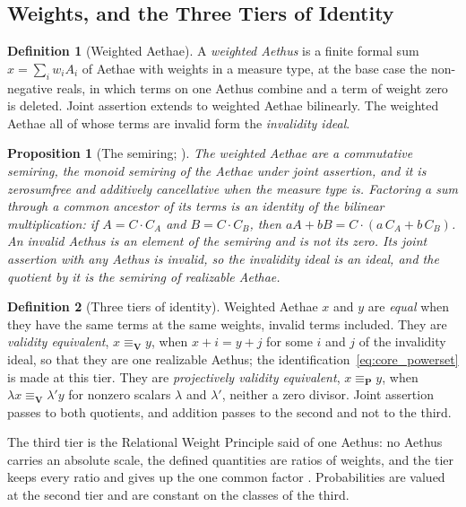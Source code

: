 \documentclass[11pt]{article}
\newtheorem{proposition}{Proposition}
\theoremstyle{definition}
\newtheorem{definition}{Definition}
\newcommand{\Aethus}{Aethus}
\begin{document}
\subsection{Weights, and the Three Tiers of Identity}\label{sec:core_weights}

\begin{definition}[Weighted Aethae]\label{def:core_weighted}
A \emph{weighted \Aethus{}} is a finite formal sum $x = \sum_i w_i A_i$ of Aethae with weights in a measure type, at the base case the non-negative reals, in which terms on one \Aethus{} combine and a term of weight zero is deleted. Joint assertion extends to weighted Aethae bilinearly. The weighted Aethae all of whose terms are invalid form the \emph{invalidity ideal}.
\end{definition}

\begin{proposition}[The semiring; \cite{AethusTree, Aethus}]\label{prop:core_semiring}
The weighted Aethae are a commutative semiring, the monoid semiring of the Aethae under joint assertion, and it is zerosumfree and additively cancellative when the measure type is. Factoring a sum through a common ancestor of its terms is an identity of the bilinear multiplication: if $A = C \cdot C_A$ and $B = C \cdot C_B$, then $aA + bB = C \cdot (a\,C_A + b\,C_B)$. An invalid \Aethus{} is an element of the semiring and is not its zero. Its joint assertion with any \Aethus{} is invalid, so the invalidity ideal is an ideal, and the quotient by it is the semiring of \emph{realizable} Aethae.
\end{proposition}

\begin{definition}[Three tiers of identity]\label{def:core_tiers}
Weighted Aethae $x$ and $y$ are \emph{equal} when they have the same terms at the same weights, invalid terms included. They are \emph{validity equivalent}, $x \equiv_{\mathbf{V}} y$, when $x + i = y + j$ for some $i$ and $j$ of the invalidity ideal, so that they are one realizable \Aethus{}; the identification~\eqref{eq:core_powerset} is made at this tier. They are \emph{projectively validity equivalent}, $x \equiv_{\mathbf{P}} y$, when $\lambda x \equiv_{\mathbf{V}} \lambda' y$ for nonzero scalars $\lambda$ and $\lambda'$, neither a zero divisor. Joint assertion passes to both quotients, and addition passes to the second and not to the third.
\end{definition}

\noindent The third tier is the Relational Weight Principle said of one \Aethus{}: no \Aethus{} carries an absolute scale, the defined quantities are ratios of weights, and the tier keeps every ratio and gives up the one common factor \cite{Aethus}. Probabilities are valued at the second tier and are constant on the classes of the third.
\end{document}
